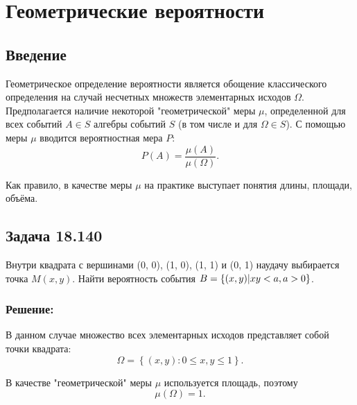 \chapter{Геометрические вероятности}

\section*{Введение}

Геометрическое определение вероятности является обощение классического определения на случай несчетных множеств элементарных исходов $\Omega$. Предполагается наличие некоторой
"геометрической"{} меры $\mu$, определенной для всех событий $A \in S$ алгебры событий $S$ (в том числе и для $\Omega \in S$). С помощью меры $\mu$ вводится вероятностная мера
$P$:
\begin{equation}
    P \left ( A \right ) = \frac{\mu \left ( A \right )}{\mu \left ( \Omega \right )}.
\end{equation}

Как правило, в качестве меры $\mu$ на практике выступает понятия длины, площади, объёма.

\section*{Задача 18.140}

Внутри квадрата с вершинами (0, 0), (1, 0), (1, 1) и (0, 1) наудачу выбирается точка $M(x,y)$. Найти вероятность события $B = \left \{ (x, y) | xy < a, a > 0 \right \}$.

\subsection*{Решение:}

В данном случае множество всех элементарных исходов представляет собой точки квадрата:
\begin{equation}
    \Omega = \left \{ (x, y) : 0 \le x, y \le 1 \right \}.
\end{equation}

В качестве "геометрической"{} меры $\mu$ используется площадь, поэтому
\begin{equation}
    \mu \left ( \Omega \right ) = 1.
\end{equation}

